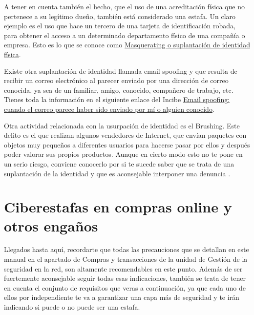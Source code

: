 \documentclass[
  a4paper,
  openany]{book}
\begin{document}
A tener en cuenta también el hecho, que el uso de una acreditación física que no pertenece a su legítimo dueño, también está considerado una estafa. Un claro ejemplo es el uso que hace un tercero de una tarjeta de identificación robada, para obtener el acceso a un determinado departamento físico de una compañía o empresa. Esto es lo que se conoce como \href{https://moodle2019-20.ua.es/moodle/pluginfile.php/113537/mod_resource/content/8/tema/4masquerading_mascarada.html\#:~:text=Consiste\%20en\%20suplantar\%20la\%20identidad,le\%20pertenecen\%20o\%20en\%20persona.}{Masquerating o suplantación de identidad física}.

Existe otra suplantación de identidad llamada email spoofing y que resulta de recibir un correo electrónico al parecer enviado por una dirección de correo conocida, ya sea de un familiar, amigo, conocido, compañero de trabajo, etc. Tienes toda la información en el siguiente enlace del Incibe \href{https://www.incibe.es/ciudadania/blog/email-spoofing-cuando-el-correo-parece-haber-sido-enviado-por-mi-o-alguien-conocido}{Email spoofing: cuando el correo parece haber sido enviado por mí o alguien conocido}.

Otra actividad relacionada con la usurpación de identidad es el Brushing. Este delito es el que realizan algunos vendedores de Internet, que envían paquetes con objetos muy pequeños a diferentes usuarios para hacerse pasar por ellos y después poder valorar sus propios productos. Aunque en cierto modo esto no te pone en un serio riesgo, conviene conocerlo por si te sucede saber que se trata de una suplantación de la identidad y que es aconsejable interponer una denuncia \citep{brushing}.

\hypertarget{ciberestafas-en-compras-online-y-otros-engauxf1os}{%
\section{Ciberestafas en compras online y otros engaños}\label{ciberestafas-en-compras-online-y-otros-engauxf1os}}

Llegados hasta aquí, recordarte que todas las precauciones que se detallan en este manual en el apartado de Compras y transacciones de la unidad de Gestión de la seguridad en la red, son altamente recomendables en este punto. Además de ser fuertemente aconsejable seguir todas esas indicaciones, también se trata de tener en cuenta el conjunto de requisitos que veras a continuación, ya que cada uno de ellos por independiente te va a garantizar una capa más de seguridad y te irán indicando si puede o no puede ser una estafa.
\end{document}
